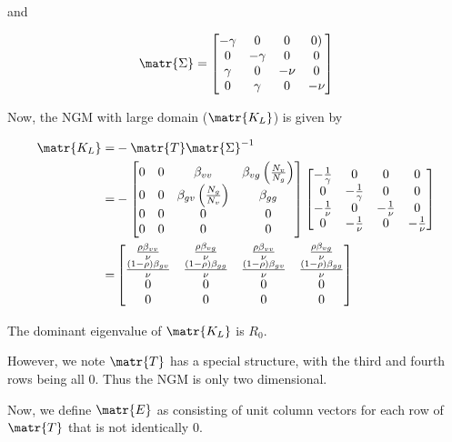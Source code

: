 \documentclass[11pt]{article}
\begin{document}
and

\[ \matr{\Sigma} =
	\begin{bmatrix}
		-\gamma	& 0	&	0	&	0)	\\
		0	&	-\gamma	&	0	&	0	\\
		\gamma	&	0	&	-\nu		&	0	\\
		0	&	\gamma	&	0	&	-\nu
	 \end{bmatrix}
 \]


Now, the NGM with large domain (\( \matr{K_L} \)) is given by

\begin{align*}
	\matr{K_L}	=&	-\matr{T}\matr{\Sigma}^{-1}\\
	=&	-\begin{bmatrix}
		0	& 0	&	\beta_{vv}	&	\beta_{vg} \left( \frac{N_v}{N_g} \right)	\\
		0	&	0	&	\beta_{gv} \left( \frac{N_g}{N_v} \right)	&	\beta_{gg}	\\
		0	&	0	&	0	&	0	\\
		0	&	0	&	0	&	0
	 \end{bmatrix}
	 \begin{bmatrix}
		-\frac{1}{\gamma} & 0 & 0 & 0	\\
		 0 & -\frac{1}{\gamma} & 0 & 0	\\
		 -\frac{1}{\nu} & 0 & -\frac{1}{\nu} & 0	\\
		 0 & -\frac{1}{\nu} & 0 & -\frac{1}{\nu}	\\
	 \end{bmatrix}\\
	 =& \begin{bmatrix}
		\frac{\rho  \beta_{vv}}{\nu } & \frac{\rho  \beta_{vg}}{\nu } & \frac{\rho  \beta_{vv}}{\nu } & \frac{\rho  \beta_{vg}}{\nu } \\
		\frac{(1-\rho ) \beta_{gv}}{\nu } & \frac{(1-\rho ) \beta_{gg}}{\nu } & \frac{(1-\rho ) \beta_{gv}}{\nu } & \frac{(1-\rho ) \beta_{gg}}{\nu } \\
		0 & 0 & 0 & 0 \\
		0 & 0 & 0 & 0 \\
	  \end{bmatrix}
\end{align*}

The dominant eigenvalue of \( \matr{K_L} \) is \( R_0 \).

However, we  note \( \matr{T} \) has a special structure, with the third and fourth rows being all 0.
Thus the NGM is only two dimensional.

Now, we define \( \matr{E} \) as consisting of unit column vectors for each row of \( \matr{T} \) that is not identically 0.
\end{document}
